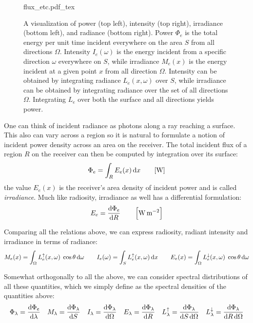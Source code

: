 \begin{figure}[tb]
    \centering
    \def\svgwidth{\linewidth}
    {flux_etc.pdf_tex}
    \caption{\label{fig:flux_etc}%
    A visualization of power (top left), intensity (top right), irradiance (bottom left), and radiance (bottom right).
    Power $\Phi_e$ is the total energy per unit time incident everywhere on the area $S$ from all directions $\Omega$. 
    Intensity $I_e(\omega)$ is the energy incident from a specific direction $\omega$ everywhere on $S$, while irradiance $M_e(x)$ is the energy incident at a given point $x$ from all direction $\Omega$.
    Intensity can be obtained by integrating radiance $L_e(x,\omega)$ over $S$, while irradiance can be obtained by integrating radiance over the set of
    all directions $\Omega$. Integrating $L_e$ over both the surface and all directions yields power. }
\end{figure}

One can think of incident radiance as photons along a ray reaching a surface.
This also can vary across a region so it is natural to formulate a notion
of incident power density across an area on the receiver.
The total incident flux of a region $R$ on the receiver can then be computed by
integration over its surface:
\begin{displaymath}
\Phi_e = \int_{R} E_e(x) \mathop{}\!\mathrm{d} x \qquad [\si{\watt}]
\end{displaymath}
the value $E_e(x)$ is the receiver's area density of incident power and
is called \textit{irradiance}.
Much like radiosity, irradiance as well has a differential formulation:
\begin{displaymath}
E_e = \frac{\mathop{}\!\mathrm{d}\Phi_e}{\mathop{}\!\mathrm{d} R} \qquad \left[\si{\watt\per\square\meter}\right]
\end{displaymath}

Comparing all the relations above, we can express radiosity, radiant intensity
and irradiance in terms of radiance:
\begin{displaymath}
M_e(x) = \int_\Omega L_e^\uparrow(x,\omega) \;\cos\theta \mathop{}\!\mathrm{d}\omega \qquad
I_e(\omega) = \int_S L_e^\uparrow(x,\omega) \mathop{}\!\mathrm{d} x \qquad
E_e(x) = \int_\Omega L_e^\downarrow(x,\omega) \;\cos\theta \mathop{}\!\mathrm{d}\omega
\end{displaymath}

Somewhat orthogonally to all the above, we can consider spectral distributions
of all these quantities, which we simply define as the spectral densities of the
quantities above:
\begin{displaymath}
\Phi_{\lambda} = \frac{\d\Phi_e}{\d\lambda} \quad
M_{\lambda} = \frac{\d\Phi_{\lambda}}{\d S} \quad
I_{\lambda} = \frac{\d\Phi_{\lambda}}{\d\Omega} \quad
E_{\lambda} = \frac{\d\Phi_{\lambda}}{\d R} \quad
L_{\lambda}^\uparrow = \frac{\d\Phi_{\lambda}}{\d S \d\Omega} \quad
L_{\lambda}^\downarrow = \frac{\d\Phi_{\lambda}}{\d R \d\Omega}
\end{displaymath}



